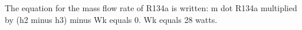 The equation for the mass flow rate of R134a is written:  
m dot R134a multiplied by (h2 minus h3) minus Wk equals 0.  
Wk equals 28 watts.